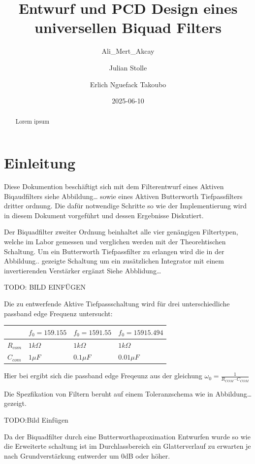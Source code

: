 \documentclass[
  ngerman,
  letterpaper,
  DIV=11]{scrreprt}
\title{Entwurf und PCD Design eines universellen Biquad Filters}
\author{Ali\_Mert\_Akcay \and Julian Stolle \and Erlich Nguefack
Takoubo}
\date{2025-06-10}
\renewcommand*\contentsname{Inhaltsverzeichnis}
\newcommand\contentsname{Inhaltsverzeichnis}
\begin{document}
\maketitle
\begin{abstract}
Lorem ipsum
\end{abstract}

\renewcommand*\contentsname{Inhaltsverzeichnis}
{
\hypersetup{linkcolor=}
\setcounter{tocdepth}{2}
\tableofcontents
}

\chapter{Einleitung}\label{einleitung}

Diese Dokumention beschäftigt sich mit dem Filterentwurf eines Aktiven
Biqaudfilters siehe Abbildung\ldots{} sowie eines Aktiven Butterworth
Tiefpassfilters dritter ordnung. Die dafür notwendige Schritte so wie
der Implementierung wird in diesem Dokument vorgeführt und dessen
Ergebnisse Diskutiert.

Der Biquadfilter zweiter Ordnung beinhaltet alle vier genängigen
Filtertypen, welche im Labor gemessen und verglichen werden mit der
Theorehtischen Schaltung. Um ein Butterworth Tiefpassfilter zu erlangen
wird die in der Abbildung.. gezeigte Schaltung um ein zusätzlichen
Integrator mit einem invertierenden Verstärker ergänzt Siehe
Abblidung\ldots{}

TODO: BILD EINFÜGEN

Die zu entwerfende Aktive Tiefpassschaltung wird für drei
unterschiedliche passband edge Frequenz untersucht:

\begin{longtable}[]{@{}llll@{}}
\toprule\noalign{}
& \(f_0 = 159.155\) & \(f_0 = 1591.55\) & \(f_0 =15915.494\) \\
\midrule\noalign{}
\endhead
\bottomrule\noalign{}
\endlastfoot
\(R_{com}\) & \(1k\Omega\) & \(1k\Omega\) & \(1k\Omega\) \\
\(C_{com}\) & \(1\mu F\) & \(0.1 \mu F\) & \(0.01 \mu F\) \\
\end{longtable}

Hier bei ergibt sich die passband edge Freqeunz aus der gleichung
\(\omega_0 = \frac{1}{R_{COM} \cdot C_{COM}}\)

Die Spezfikation von Filtern beruht auf einem Toleranzschema wie in
Abbildung\ldots{} gezeigt.

TODO:Bild Einfügen

Da der Biquadfilter durch eine Butterworthaproximation Entwurfen wurde
so wie die Erweiterte schaltung ist im Durchlassbereich ein
Glatterverlauf zu erwarten je nach Grundverstärkung entwerder um 0dB
oder höher.
\end{document}
